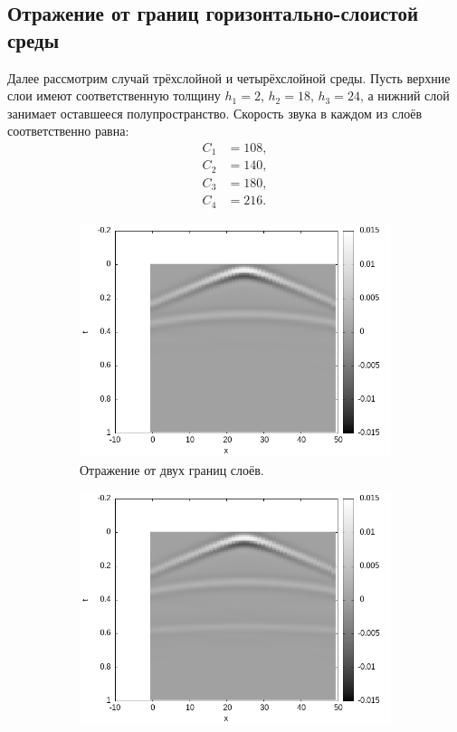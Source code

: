 \documentclass[a4paper, fontsize=14pt]{article}
\begin{document}
	\subsection{Отражение от границ горизонтально-слоистой среды}
	Далее рассмотрим случай трёхслойной и четырёхслойной среды. Пусть верхние слои имеют соответственную толщину $h_1 = 2$, $h_2 = 18$, $h_3 = 24$, а нижний слой занимает оставшееся полупространство. Скорость звука в каждом из слоёв соответственно равна:
	\begin{align*}
		C_1 &= 108,\\
		C_2 &= 140,\\
		C_3 &= 180,\\
		C_4 & = 216.
	\end{align*}
	\begin{figure}[H]
	\begin{subfigure}{.5\textwidth}
		\centering
		\includegraphics[width=\textwidth]{smooth_double_far_seism.png}
		\caption{Отражение от двух границ слоёв.}
		\label{fig:multi_hor2}
	\end{subfigure}
	\begin{subfigure}{.5\textwidth}
		\centering
		\includegraphics[width=\textwidth]{smooth_triple_far_seism.png}

\end{subfigure}
\end{figure}
\end{document}

